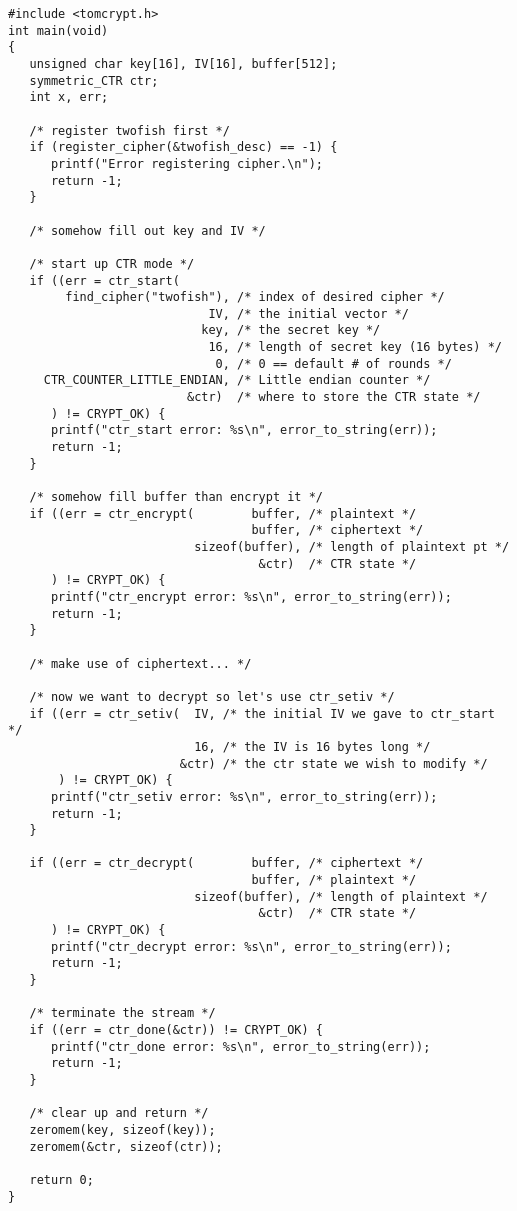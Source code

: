 \documentclass[synpaper]{book}
\begin{document}
\begin{small}
\begin{verbatim}
#include <tomcrypt.h>
int main(void)
{
   unsigned char key[16], IV[16], buffer[512];
   symmetric_CTR ctr;
   int x, err;

   /* register twofish first */
   if (register_cipher(&twofish_desc) == -1) {
      printf("Error registering cipher.\n");
      return -1;
   }

   /* somehow fill out key and IV */

   /* start up CTR mode */
   if ((err = ctr_start(
        find_cipher("twofish"), /* index of desired cipher */
                            IV, /* the initial vector */
                           key, /* the secret key */
                            16, /* length of secret key (16 bytes) */
                             0, /* 0 == default # of rounds */
     CTR_COUNTER_LITTLE_ENDIAN, /* Little endian counter */
                         &ctr)  /* where to store the CTR state */
      ) != CRYPT_OK) {
      printf("ctr_start error: %s\n", error_to_string(err));
      return -1;
   }

   /* somehow fill buffer than encrypt it */
   if ((err = ctr_encrypt(        buffer, /* plaintext */
                                  buffer, /* ciphertext */
                          sizeof(buffer), /* length of plaintext pt */
                                   &ctr)  /* CTR state */
      ) != CRYPT_OK) {
      printf("ctr_encrypt error: %s\n", error_to_string(err));
      return -1;
   }

   /* make use of ciphertext... */

   /* now we want to decrypt so let's use ctr_setiv */
   if ((err = ctr_setiv(  IV, /* the initial IV we gave to ctr_start */
                          16, /* the IV is 16 bytes long */
                        &ctr) /* the ctr state we wish to modify */
       ) != CRYPT_OK) {
      printf("ctr_setiv error: %s\n", error_to_string(err));
      return -1;
   }

   if ((err = ctr_decrypt(        buffer, /* ciphertext */
                                  buffer, /* plaintext */
                          sizeof(buffer), /* length of plaintext */
                                   &ctr)  /* CTR state */
      ) != CRYPT_OK) {
      printf("ctr_decrypt error: %s\n", error_to_string(err));
      return -1;
   }

   /* terminate the stream */
   if ((err = ctr_done(&ctr)) != CRYPT_OK) {
      printf("ctr_done error: %s\n", error_to_string(err));
      return -1;
   }

   /* clear up and return */
   zeromem(key, sizeof(key));
   zeromem(&ctr, sizeof(ctr));

   return 0;
}
\end{verbatim}
\end{small}
\end{document}

